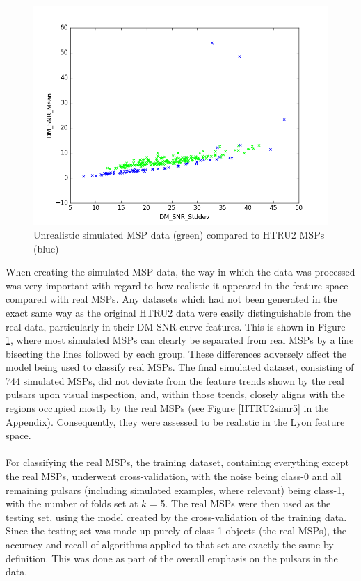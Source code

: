 \documentclass[12pt]{article}
\begin{document}
\begin{figure}[h!]
\begin{center}
\includegraphics[scale=0.5]{HTRU2_msp(b)_sim_r3(g)_dm_mean_vs_stddev.png}
\caption{Unrealistic simulated MSP data (green) compared to HTRU2 MSPs (blue)}
\label{DMMeanStddevBadvsMSP}
\end{center}
\end{figure}

When creating the simulated MSP data, the way in which the data was processed was very important with regard to how realistic it appeared in the feature space compared with real MSPs. Any datasets which had not been generated in the exact same way as the original HTRU2 data were easily distinguishable from the real data, particularly in their DM-SNR curve features. This is shown in Figure \ref{DMMeanStddevBadvsMSP}, where most simulated MSPs can clearly be separated from real MSPs by a line bisecting the lines followed by each group. These differences adversely affect the model being used to classify real MSPs. The final simulated dataset, consisting of 744 simulated MSPs, did not deviate from the feature trends shown by the real pulsars upon visual inspection, and, within those trends, closely aligns with the regions occupied mostly by the real MSPs (see Figure \ref{HTRU2simr5} in the Appendix). Consequently, they were assessed to be realistic in the Lyon feature space.
\paragraph{}
For classifying the real MSPs, the  training dataset, containing everything except the real MSPs, underwent cross-validation, with the noise being class-0 and all remaining pulsars (including simulated examples, where relevant) being class-1, with the number of folds set at $k$ = 5. The real MSPs were then used as the testing set, using the model created by the cross-validation of the training data. Since the testing set was made up purely of class-1 objects (the real MSPs), the accuracy and recall of algorithms applied to that set are exactly the same by definition. This was done as part of the overall emphasis on the pulsars in the data.
\end{document}
